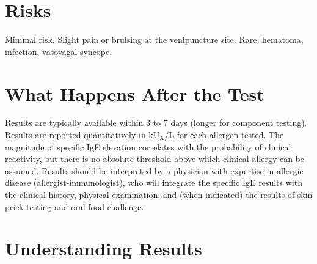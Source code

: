 \section*{Risks}
Minimal risk. Slight pain or bruising at the venipuncture site. Rare: hematoma, infection, vasovagal syncope.

\section*{What Happens After the Test}
Results are typically available within 3 to 7 days (longer for component testing). Results are reported quantitatively in kU$_\text{A}$/L for each allergen tested. The magnitude of specific IgE elevation correlates with the probability of clinical reactivity, but there is no absolute threshold above which clinical allergy can be assumed. Results should be interpreted by a physician with expertise in allergic disease (allergist-immunologist), who will integrate the specific IgE results with the clinical history, physical examination, and (when indicated) the results of skin prick testing and oral food challenge.

\section*{Understanding Results}

